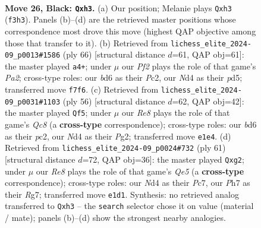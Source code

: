 \documentclass[11pt]{article}
\begin{document}
\clearpage

\begin{figure}[p]\centering
\begin{subfigure}{0.46\textwidth}\centering
\resizebox{\linewidth}{!}{%
\newchessgame
\chessboard[
  setfen={4r1k1/p4p1p/3B2p1/8/3n4/P4q1P/5P2/R3rQK1 b - - 2 26},
  showmover=false,
  pgfstyle=straightmove, color=movearrow, markmove={f3-h3}
]}
\caption{}
\end{subfigure}\hfill
\begin{subfigure}{0.46\textwidth}\centering
\resizebox{\linewidth}{!}{%
\newchessgame
\chessboard[
  setfen={6rr/R2Q4/1pq1p2p/1k1p4/7P/8/PPP5/1K1R4 w - - 10 34},
  showmover=false,
  pgfstyle=straightmove, color=movearrow, markmove={a2-a4}
]}
\caption{}
\end{subfigure}
\\[4pt]
\begin{subfigure}{0.46\textwidth}\centering
\resizebox{\linewidth}{!}{%
\newchessgame
\chessboard[
  setfen={2Q1qk2/5pr1/pp6/2b3p1/2P5/5R2/P1p3PP/5R1K w - - 3 29},
  showmover=false,
  pgfstyle=straightmove, color=movearrow, markmove={c8-f5}
]}
\caption{}
\end{subfigure}\hfill
\begin{subfigure}{0.46\textwidth}\centering
\resizebox{\linewidth}{!}{%
\newchessgame
\chessboard[
  setfen={5rk1/p1p3rp/2p5/3pP3/4q3/4R3/PPP1Q1P1/1K5R b - - 8 31},
  showmover=false,
  pgfstyle=straightmove, color=movearrow, markmove={e4-g2}
]}
\caption{}
\end{subfigure}
\caption{\textbf{Move 26, Black: \texttt{Qxh3}.} (a) Our position; Melanie plays \texttt{Qxh3} (\texttt{f3h3}). Panels (b)--(d) are the retrieved master positions whose correspondence most drove this move (highest QAP objective among those that transfer to it). (b) Retrieved from \texttt{lichess\_elite\_2024-09\_p0013\#1586} (ply 66) [structural distance $d$=61, QAP obj=61]: the master played \texttt{a4+}; under $\mu$ our \emph{Pf2} plays the role of that game's \emph{Pa2}; cross-type roles: our \emph{b}d6 as their \emph{P}c2, our \emph{N}d4 as their \emph{p}d5; transferred move \texttt{f7f6}. (c) Retrieved from \texttt{lichess\_elite\_2024-09\_p0031\#1103} (ply 56) [structural distance $d$=62, QAP obj=42]: the master played \texttt{Qf5}; under $\mu$ our \emph{Re8} plays the role of that game's \emph{Qc8} (a \textbf{cross-type} correspondence); cross-type roles: our \emph{b}d6 as their \emph{p}c2, our \emph{N}d4 as their \emph{P}g2; transferred move \texttt{e1e4}. (d) Retrieved from \texttt{lichess\_elite\_2024-09\_p0024\#732} (ply 61) [structural distance $d$=72, QAP obj=36]: the master played \texttt{Qxg2}; under $\mu$ our \emph{Re8} plays the role of that game's \emph{Qe5} (a \textbf{cross-type} correspondence); cross-type roles: our \emph{N}d4 as their \emph{P}c7, our \emph{P}h7 as their \emph{R}g7; transferred move \texttt{e1d1}. Synthesis: no retrieved analog transferred to \texttt{Qxh3} -- the \texttt{search} selector chose it on value (material / mate); panels (b)--(d) show the strongest nearby analogies.}
\label{fig:thought-m51}
\end{figure}
\end{document}
